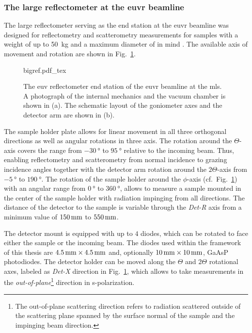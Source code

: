 \subsubsection{The large reflectometer at the \gls{euvr} beamline}
The large reflectometer serving as the end station at the \gls{euvr} beamline was designed for reflectometry and scatterometry measurements for samples with a weight of up to \SI{50}{\kg} and a maximum diameter of  in mind \cite{tummler_characterization_2003}. The available axis of movement and rotation are shown in Fig.~\ref{ch_exp:fig_bigref}.
\begin{figure}[htb]
    \def\svgwidth{\textwidth}
    {bigref.pdf_tex}
    \caption[The BigRef.]{The \gls{euv} reflectometer end station of the \gls{euvr} beamline at the \gls{mls}. A photograph of the internal mechanics and the vacuum chamber is shown in (a). The schematic layout of the goniometer axes and the detector arm are shown in (b).}
    \label{ch_exp:fig_bigref}
\end{figure}
The sample holder plate allows for linear movement in all three orthogonal directions as well as angular rotations in three axis. The rotation around the $\Theta$-axis covers the range from $\SI{-30}{\degree}$ to $\SI{95}{\degree}$ relative to the incoming beam. Thus, enabling reflectometry and scatterometry from normal incidence to grazing incidence angles together with the detector arm rotation around the $2\Theta$-axis from $\SI{-5}{\degree}$ to $\SI{190}{\degree}$. The rotation of the sample holder around the $\phi$-axis (cf.~Fig.~\ref{ch_exp:fig_bigref}) with an angular range from $\SI{0}{\degree}$ to $\SI{360}{\degree}$, allows to measure a sample mounted in the center of the sample holder with radiation impinging from all directions. The distance of the detector to the sample is variable through the \emph{Det-R} axis from a minimum value of $\mm{150}$ to $\mm{550}$.

The detector mount is equipped with up to $4$ diodes, which can be rotated to face either the sample or the incoming beam. The diodes used within the framework of this thesis are $\mm{4.5} \times \mm{4.5}$ and, optionally $\mm{10} \times \mm{10}$, GaAsP photodiodes. The detector holder can be moved along the $\Theta$ and $2\Theta$ rotational axes, labeled as \emph{Det-X} direction in Fig.~\ref{ch_exp:fig_bigref}, which allows to take measurements in the \emph{out-of-plane}\footnote{The out-of-plane scattering direction refers to radiation scattered outside of the scattering plane spanned by the surface normal of the sample and the impinging beam direction.} direction in s-polarization.

